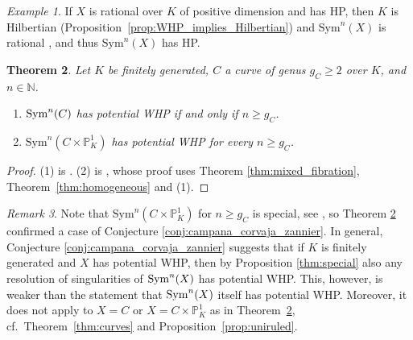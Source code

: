\documentclass[10pt,a4paper]{amsart}
\theoremstyle{plain}
\newtheorem{theorem}{Theorem}
\theoremstyle{remark}
\newtheorem{remark}[theorem]{Remark}
\newtheorem{example}[theorem]{Example}
\numberwithin{theorem}{section}
\begin{document}
\begin{example}
If $X$ is rational over $K$ of positive dimension and has HP,
then $K$ is Hilbertian (Proposition~\ref{prop:WHP_implies_Hilbertian})
and $\mathrm{Sym}^n(X)$ is rational \cite{Mattuck}, 
and thus $\mathrm{Sym}^n(X)$ has HP. 
\end{example}

\begin{theorem}\label{thm:sym_prods_1}
Let $K$ be finitely generated,
$C$  a curve of genus $g_C\geq 2$ over $K$, 
and  $n\in\mathbb{N}$. 
\begin{enumerate}
    \item ${\rm Sym}^n(C)$ has potential WHP if and only if $n\geq g_C$.
    \item $\mathrm{Sym}^n(C\times \mathbb{P}^1_K)$ has potential WHP for every $n\geq g_C$.  
\end{enumerate}
\end{theorem}

\begin{proof}
(1) is \cite[Lemma~6.3]{BJL}.
(2) is \cite[Theorem~B]{BJL},
whose proof uses Theorem \ref{thm:mixed_fibration}, Theorem~\ref{thm:homogeneous} and (1).
\end{proof}

\begin{remark} 
Note that $\mathrm{Sym}^n(C\times \mathbb{P}^1_K)$ for $n\geq g_C$
is special, see \cite[Theorem 14]{CCR},
so Theorem \ref{thm:sym_prods_1} confirmed a case of Conjecture \ref{conj:campana_corvaja_zannier}.
In general, Conjecture \ref{conj:campana_corvaja_zannier}
suggests that 
if $K$ is finitely generated and
$X$ has potential WHP, then 
by Proposition \ref{thm:special} also
any resolution of singularities of ${\rm Sym}^n(X)$ has potential WHP.
This, however, is weaker than the statement that 
${\rm Sym}^n(X)$ itself has potential WHP.
Moreover, it does not apply to 
$X=C$ or
$X=C\times\mathbb{P}^1_K$ as in Theorem~\ref{thm:sym_prods_1},
cf.~Theorem~\ref{thm:curves} and Proposition~\ref{prop:uniruled}.  
\end{remark}
   
\end{document}
